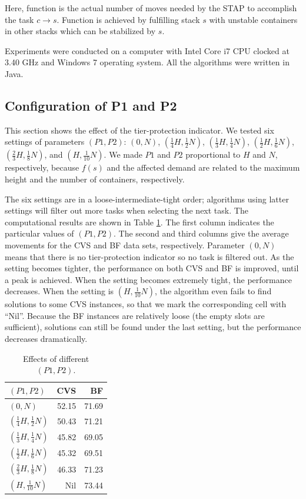 \documentclass[review,3p,times,12pt,number]{elsarticle}\usepackage{amsmath}\usepackage{amssymb}
\begin{document}
Here, function  is the actual number of moves needed by the STAP to accomplish the task $c\rightarrow s$. Function  is achieved by fulfilling stack $s$ with unstable containers in other stacks which can be stabilized by $s$.

Experiments were conducted on a computer with Intel Core i7 CPU clocked at 3.40 GHz and Windows 7 operating system. All the algorithms were written in Java.

\subsection{Configuration of P1 and P2}
This section shows the effect of the tier-protection indicator. We tested six settings of parameters $(P1,P2)$: $(0,N)$, $(\frac{1}{4}H,\frac{1}{2}N)$, $(\frac{1}{3}H,\frac{1}{4}N)$, $(\frac{1}{2}H,\frac{1}{6}N)$, $(\frac{2}{3}H,\frac{1}{8}N)$, and $(H,\frac{1}{10}N)$. We made $P1$ and $P2$ proportional to $H$ and $N$, respectively, because $f(s)$  and the affected demand are related to the maximum height and the number of containers, respectively.

The six settings are in a loose-intermediate-tight order; algorithms using latter settings will filter out more tasks when selecting the next task. The computational results are shown in Table \ref{tab:tier-protection}.
The first column indicates the particular values of $(P1,P2)$. The second and third columns give the average movements for the CVS and BF data sets, respectively.
Parameter $(0,N)$ means that there is no tier-protection indicator so no task is filtered out.
As the setting becomes tighter, the performance on both CVS and BF is improved, until a peak is achieved.
When the setting becomes extremely tight, the performance decreases.
When the setting is $(H,\frac{1}{10}N)$, the algorithm even fails to find solutions to some CVS instances, so that we mark the corresponding cell with ``Nil''. Because the BF instances are relatively loose (the empty slots are sufficient), solutions can still be found under the last setting, but the performance decreases dramatically.
\begin{table}[htbp]
  \centering
  \caption{Effects of different $(P1,P2)$.}
    \begin{tabular}{lrr}
    \toprule
    $(P1,P2)$ & CVS   & BF \\
    \midrule
    $(0,N)$   & 52.15 & 71.69 \\
    $(\frac{1}{4}H,\frac{1}{2}N)$ & 50.43 & 71.21 \\
    $(\frac{1}{3}H,\frac{1}{4}N)$ & 45.82 & 69.05 \\
    $(\frac{1}{2}H,\frac{1}{6}N)$ & 45.32 & 69.51 \\
    $(\frac{2}{3}H,\frac{1}{8}N)$ & 46.33 & 71.23 \\
    $(H,\frac{1}{10}N)$ & Nil   & 73.44 \\
    \bottomrule
    \end{tabular}
  \label{tab:tier-protection}
\end{table}
\end{document}
